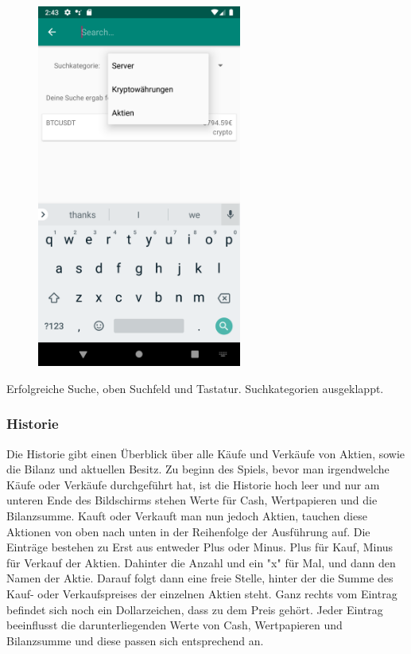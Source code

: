 \documentclass[10pt]{scrartcl}
\begin{document}
\begin{figure}[H]
	\centering
	\includegraphics[width=0.6\textwidth]{Bilder/Applikation/Suche.png}
\end{figure}
Erfolgreiche Suche, oben Suchfeld und Tastatur. Suchkategorien ausgeklappt.

\subsubsection{Historie}

Die Historie gibt einen Überblick über alle Käufe und Verkäufe von Aktien, sowie die Bilanz und aktuellen Besitz. Zu beginn des Spiels, bevor man irgendwelche Käufe oder Verkäufe durchgeführt hat, ist die Historie hoch leer und nur am unteren Ende des Bildschirms stehen Werte für Cash, Wertpapieren und die Bilanzsumme. Kauft oder Verkauft man nun jedoch Aktien, tauchen diese Aktionen von oben nach unten in der Reihenfolge der Ausführung auf. Die Einträge bestehen zu Erst aus entweder Plus oder Minus. Plus für Kauf, Minus für Verkauf der Aktien. Dahinter die Anzahl und ein "x" für Mal, und dann den Namen der Aktie. Darauf folgt dann eine freie Stelle, hinter der die Summe des Kauf- oder Verkaufspreises der einzelnen Aktien steht. Ganz rechts vom Eintrag befindet sich noch ein Dollarzeichen, dass zu dem Preis gehört.
Jeder Eintrag beeinflusst die darunterliegenden Werte von Cash, Wertpapieren und Bilanzsumme und diese passen sich entsprechend an.
\end{document}
